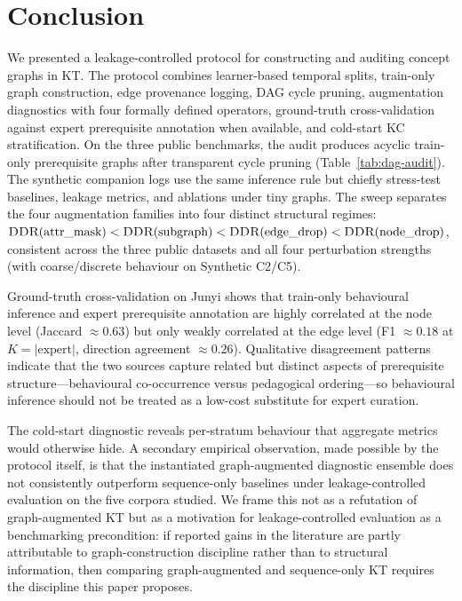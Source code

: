 \section{Conclusion}
\label{sec:concl}
We presented a leakage-controlled protocol for constructing and auditing
concept graphs in KT. The protocol combines learner-based temporal
splits, train-only graph construction, edge provenance logging, DAG
cycle pruning, \DDR{} augmentation diagnostics with four formally
defined operators, ground-truth cross-validation against expert
prerequisite annotation when available, and cold-start KC
stratification. On the three public benchmarks, the
audit produces acyclic train-only prerequisite graphs after transparent
cycle pruning (Table~\ref{tab:dag-audit}). The synthetic companion logs use the same inference rule but chiefly stress-test baselines, leakage metrics, and ablations under tiny graphs.
The \DDR{} sweep separates the four augmentation
families into four distinct structural regimes:
$\textsc{DDR}(\text{attr\_mask}) < \textsc{DDR}(\text{subgraph}) <
\textsc{DDR}(\text{edge\_drop}) < \textsc{DDR}(\text{node\_drop})$,
consistent across the three public datasets and all four perturbation
strengths (with coarse/discrete behaviour on Synthetic C2/C5).

Ground-truth cross-validation on Junyi shows that train-only
behavioural inference and expert prerequisite annotation are highly
correlated at the node level (Jaccard $\approx 0.63$) but only weakly
correlated at the edge level (F1 $\approx 0.18$ at $K=|\text{expert}|$,
direction agreement $\approx 0.26$). Qualitative disagreement patterns
indicate that the two sources capture related but distinct aspects of
prerequisite structure---behavioural co-occurrence versus pedagogical
ordering---so behavioural inference should not be treated as a
low-cost substitute for expert curation.

The cold-start diagnostic reveals per-stratum behaviour that aggregate
metrics would otherwise hide. A secondary empirical observation, made
possible by the protocol itself, is that the instantiated
graph-augmented diagnostic ensemble does not consistently outperform
sequence-only baselines under leakage-controlled evaluation on the
five corpora studied. We frame this not as a refutation of
graph-augmented KT but as a motivation for leakage-controlled
evaluation as a benchmarking precondition: if reported gains in the
literature are partly attributable to graph-construction discipline
rather than to structural information, then comparing graph-augmented
and sequence-only KT requires the discipline this paper proposes.

